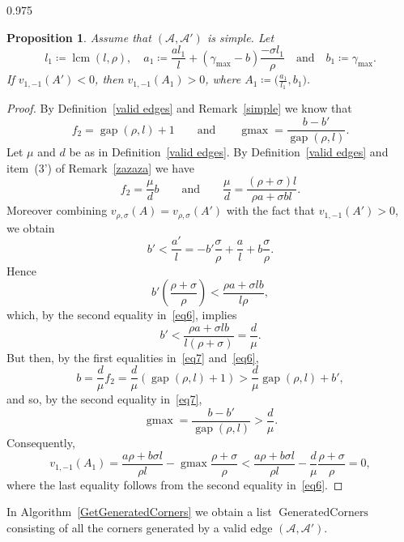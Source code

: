 \documentclass[reqno,a4paper,twoside]{amsart}
\newtheorem{proposition}[theorem]{Proposition}
\theoremstyle{definition}
\theoremstyle{remark}
\DeclareMathOperator{\gap}{gap}
\DeclareMathOperator{\lcm}{lcm}
\DeclareMathOperator{\GeneratedCorners}{GeneratedCorners}
\DeclareMathOperator{\gmax}{gmax}
\begin{document}
\begin{spacing}{0.975}
\begin{proposition} Assume that $(\mathcal{A},\mathcal{A}')$ is simple. Let
$$
l_1\coloneqq \lcm(l,\rho),\quad a_1\coloneqq \frac{al_1}{l} + (\gamma_{\max}-b)\frac{-\sigma l_1}{\rho}\quad\text{and}\quad b_1\coloneqq \gamma_{\max}.
$$
If $v_{1,-1}(A')<0$, then $v_{1,-1}(A_1)>0$, where $A_1 \coloneqq \bigl(\frac{a_1}{l_1},b_1\bigr)$.
\end{proposition}

\begin{proof} By Definition~\ref{valid edges} and Remark~\ref{simple} we know that
\begin{equation}\label{eq7}
f_2=\gap(\rho,l)+1\qquad\text{and}\qquad \gmax=\frac{b-b'}{\gap(\rho,l)}.
\end{equation}
Let $\mu$ and $d$ be as in Definition~\ref{valid edges}. By Definition~\ref{valid edges} and item~(3') of Remark~\ref{zazaza} we have
\begin{equation}\label{eq6}
f_2 = \frac{\mu}{d} b\qquad\text{and}\qquad \frac{\mu}{d} = \frac{(\rho+\sigma)l}{\rho a + \sigma b l}.
\end{equation}
Moreover combining $v_{\rho,\sigma}(A)={v_{\rho,\sigma}(A')}$ with the fact that $v_{1,-1}(A')>0$, we  obtain
$$
b' < \frac {a'}{l}=-b'\frac{\sigma}{\rho}+\frac{a}l+b\frac{\sigma}{\rho}.
$$
Hence
$$
b'\left(\frac{\rho+\sigma}{\rho}\right)<\frac{\rho a+\sigma l b}{l\rho},
$$
which, by the second equality in~\eqref{eq6}, implies
$$
b'<\frac{\rho a+\sigma l b}{l(\rho+\sigma)}=\frac{d}{\mu}.
$$
But then, by the first equalities in~\eqref{eq7} and~\eqref{eq6},
$$
b=\frac{d}{\mu} f_2=\frac{d}{\mu}(\gap(\rho,l)+1)>\frac{d}{\mu} \gap(\rho,l) + b',
$$
and so, by the second equality in~\eqref{eq7},
$$
\gmax = \frac{b-b'}{\gap(\rho,l)}>\frac{d}{\mu}.
$$
Consequently,
$$
v_{1,-1}(A_1)=\frac{a\rho+b\sigma l}{\rho l}-\gmax \frac{\rho+\sigma}{\rho} < \frac{a\rho+b\sigma l}{\rho l}- \frac{d}{\mu}\frac{\rho+\sigma}{\rho}=0,
$$
where the last equality follows from the second equality in~\eqref{eq6}.
\end{proof}

In Algorithm~\ref{GetGeneratedCorners} we obtain a list $\GeneratedCorners$ consisting of all the corners generated by a valid edge $(\mathcal{A},\mathcal{A}')$.


\end{spacing}
\end{document}
